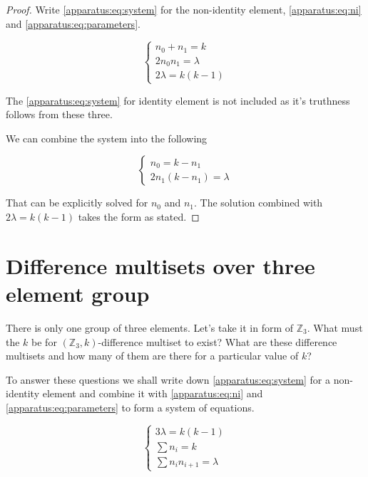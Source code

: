 \documentclass{article}
\theoremstyle{plain}
\theoremstyle{definition}
\theoremstyle{remark}
\begin{document}
			\begin{proof}
				Write \eqref{apparatus:eq:system} for the non-identity element, \eqref{apparatus:eq:ni} and \eqref{apparatus:eq:parameters}.
				
				\begin{equation}
					\begin{cases}
						n_0 + n_1 = k \\
						2 n_0 n_1 = \lambda \\
						2 \lambda = k(k-1)
					\end{cases}
				\end{equation}
				
				The \eqref{apparatus:eq:system} for identity element is not included as it's truthness follows from these three.
				
				We can combine the system into the following
				
				\begin{equation}
					\begin{cases}
						n_0 = k - n_1\\
						2 n_1 (k - n_1) = \lambda
					\end{cases}
				\end{equation}
				
				That can be explicitly solved for $n_0$ and $n_1$. The solution combined with $2 \lambda = k(k-1)$ takes the form as stated.
			\end{proof}
		
	\section{Difference multisets over three element group}
		There is only one group of three elements. Let's take it in form of $\mathbb Z_3$. What must the $k$ be for $(\mathbb Z_3,k)$-difference multiset to exist? What are these difference multisets and how many of them are there for a particular value of $k$?
		
		To answer these questions we shall write down \eqref{apparatus:eq:system} for a non-identity element and combine it with \eqref{apparatus:eq:ni} and \eqref{apparatus:eq:parameters} to form a system of equations.
		
		\begin{equation}
			\label{v3:eq:constraints}
			\begin{cases}
				3\lambda = k(k-1) \\
				\sum n_i = k \\
				\sum n_i n_{i+1} = \lambda
			\end{cases}
		\end{equation}
		
\end{document}
